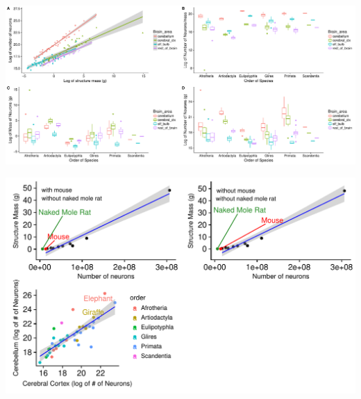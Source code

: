 \documentclass[landscape,final,paperwidth=60in,paperheight=39in,fontscale=0.285]{baposter}
\begin{document}
\begin{poster}
    {
 \begin{center}
 \includegraphics[scale=0.5,valign=t]{img/Allplot.pdf}
 \end{center}
}

    {
 \begin{center}
 \includegraphics[scale=0.5,valign=t]{img/3plots.pdf}
 \end{center}
}


\end{poster}
\end{document}
